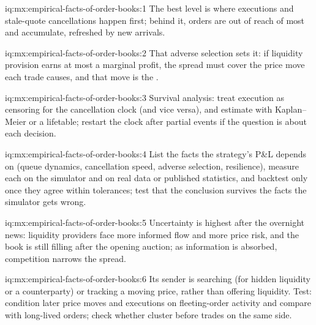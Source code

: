 \begin{solution}{iq:mx:empirical-facts-of-order-books:1}
The best level is where executions and stale-quote cancellations happen first; behind it, orders are out of reach of most  and accumulate,
refreshed by new arrivals. 
\end{solution}

\begin{solution}{iq:mx:empirical-facts-of-order-books:2}
That adverse selection sets it: if liquidity provision earns at most a marginal profit, the spread must cover the price move each trade causes, and that
move is the . 
\end{solution}

\begin{solution}{iq:mx:empirical-facts-of-order-books:3}
Survival analysis: treat execution as censoring for the cancellation clock (and vice versa), and estimate with Kaplan--Meier or a lifetable; restart the
clock after partial events if the question is about each decision. 
\end{solution}

\begin{solution}{iq:mx:empirical-facts-of-order-books:4}
List the facts the strategy's P\&L depends on (queue dynamics, cancellation speed, adverse selection, resilience), measure each on the simulator and on
real data or published statistics, and backtest only once they agree within tolerances; test that the conclusion survives the facts the simulator gets
wrong. 
\end{solution}

\begin{solution}{iq:mx:empirical-facts-of-order-books:5}
Uncertainty is highest after the overnight news: liquidity providers face more informed flow and more price risk, and the book is still filling after the
opening auction; as information is absorbed, competition narrows the spread. 
\end{solution}

\begin{solution}{iq:mx:empirical-facts-of-order-books:6}
Its sender is searching (for hidden liquidity or a counterparty) or tracking a moving price, rather than offering liquidity. Test: condition later price
moves and executions on fleeting-order activity and compare with long-lived orders; check whether  cluster before trades on the same side.
\end{solution}
